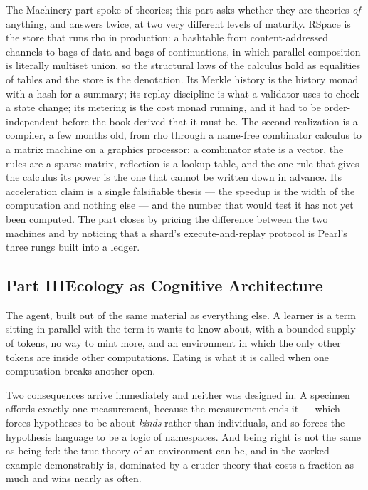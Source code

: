 \documentclass[12pt,openright,twoside]{book}
\theoremstyle{remark}
\theoremstyle{plain}
\theoremstyle{remark}
\theoremstyle{plain}
\theoremstyle{plain}
\begin{document}
The Machinery part spoke of theories; this part asks whether they are
theories \emph{of} anything, and answers twice, at two very different
levels of maturity.
RSpace is the store that runs rho in production: a hashtable from
content-addressed channels to bags of data and bags of continuations, in
which parallel composition is literally multiset union, so the structural
laws of the calculus hold as equalities of tables and the store is the
denotation.
Its Merkle history is the history monad with a hash for a summary; its
replay discipline is what a validator uses to check a state change; its
metering is the cost monad running, and it had to be order-independent
before the book derived that it must be.
The second realization is a compiler, a few months old, from rho through a
name-free combinator calculus to a matrix machine on a graphics processor:
a combinator state is a vector, the rules are a sparse matrix, reflection
is a lookup table, and the one rule that gives the calculus its power is
the one that cannot be written down in advance.
Its acceleration claim is a single falsifiable thesis --- the speedup is the
width of the computation and nothing else --- and the number that would
test it has not yet been computed.
The part closes by pricing the difference between the two machines and by
noticing that a shard's execute-and-replay protocol is Pearl's three rungs
built into a ledger.

\subsection*{Part III\quad Ecology as Cognitive Architecture}

The agent, built out of the same material as everything else.
A learner is a term sitting in parallel with the term it wants to know
about, with a bounded supply of tokens, no way to mint more, and an
environment in which the only other tokens are inside other computations.
Eating is what it is called when one computation breaks another open.

Two consequences arrive immediately and neither was designed in.
A specimen affords exactly one measurement, because the measurement ends
it --- which forces hypotheses to be about \emph{kinds} rather than
individuals, and so forces the hypothesis language to be a logic of
namespaces.
And being right is not the same as being fed: the true theory of an
environment can be, and in the worked example demonstrably is, dominated
by a cruder theory that costs a fraction as much and wins nearly as
often.
\end{document}
